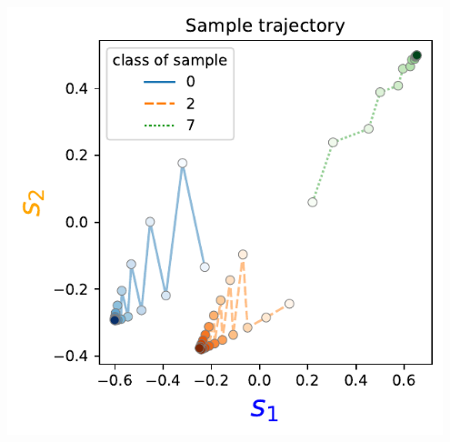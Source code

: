 \begin{frame}{\subsecname}
\begin{minipage}{\textwidth}
\begin{minipage}{0.65\textwidth}
    \end{minipage}
    \hfill
    \begin{minipage}{0.33\textwidth}
        \includegraphics[width=0.95\textwidth]{img/echo_sample_traj}
    \end{minipage}
\end{minipage}

\end{frame}

